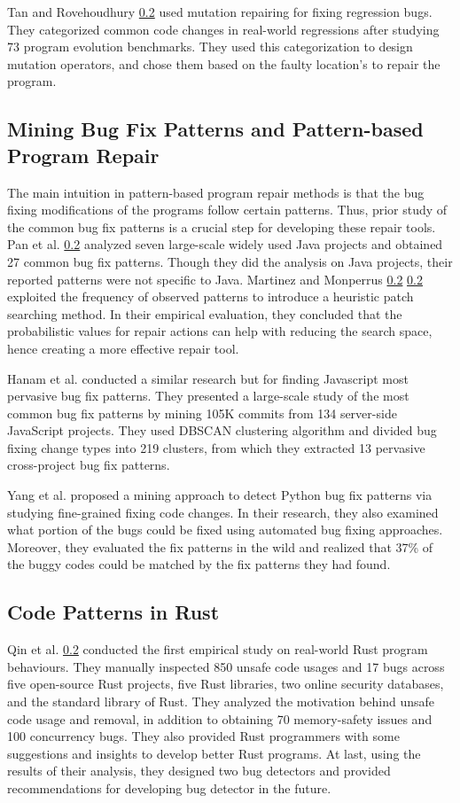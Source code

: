 Tan and Rovehoudhury \ref{} used mutation repairing for fixing regression bugs. They categorized common code changes in real-world regressions after studying 73 program evolution benchmarks. They used this categorization to design mutation operators, and chose them based on the faulty location’s to repair the program.

\subsection{Mining Bug Fix Patterns and Pattern-based Program Repair}

The main intuition in pattern-based program repair methods is that the bug fixing modifications of the programs follow certain patterns. Thus, prior study of the common bug fix patterns is a crucial step for developing these repair tools. Pan et al. \ref{} analyzed seven large-scale widely used Java projects and obtained 27 common bug fix patterns. Though they did the analysis on Java projects, their reported patterns were not specific to Java. Martinez and Monperrus \ref{} \ref{} exploited the frequency of observed patterns to introduce a heuristic patch searching method. In their empirical evaluation, they concluded that the probabilistic values for repair actions can help with reducing the search space, hence creating a more effective repair tool.

Hanam et al. conducted a similar research but for finding Javascript most pervasive bug fix patterns. They presented a large-scale study of the most common bug fix patterns by mining 105K commits from 134 server-side JavaScript projects. They used DBSCAN clustering algorithm and divided bug fixing change types into 219 clusters, from which they extracted 13 pervasive cross-project bug fix patterns. 

Yang et al. proposed a mining approach to detect Python bug fix patterns via studying fine-grained fixing code changes. In their research, they also examined what portion of the bugs could be fixed using automated bug fixing approaches. Moreover, they evaluated the fix patterns in the wild and realized that 37\% of the buggy codes could be matched by the fix patterns they had found. 

\subsection{Code Patterns in Rust}

Qin et al. \ref{} conducted the first empirical study on real-world Rust program behaviours. They manually inspected 850 unsafe code usages and 17 bugs across five open-source Rust projects, five Rust libraries, two online security databases, and the standard library of Rust. They analyzed the motivation behind unsafe code usage and removal, in addition to obtaining 70 memory-safety issues and 100 concurrency bugs. They also provided Rust programmers with some suggestions and insights to develop better Rust programs. At last, using the results of their analysis, they designed two bug detectors and provided recommendations for developing bug detector in the future.

